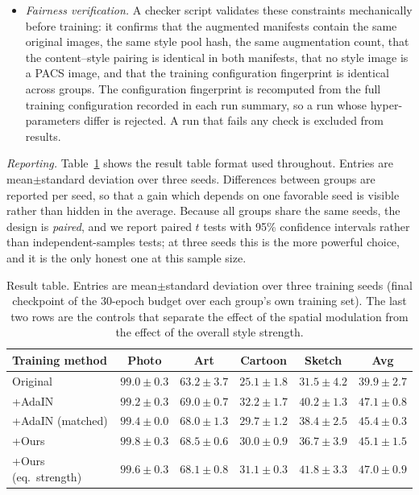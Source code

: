 \begin{itemize}
\item \textit{Fairness verification.} A checker script validates these constraints mechanically before training: it confirms that the augmented manifests contain the same original images, the same style pool hash, the same augmentation count, that the content--style pairing is identical in both manifests, that no style image is a PACS image, and that the training configuration fingerprint is identical across groups. The configuration fingerprint is recomputed from the full training configuration recorded in each run summary, so a run whose hyper-parameters differ is rejected. A run that fails any check is excluded from results.
\end{itemize}

\textit{Reporting.} Table~\ref{tab:results} shows the result table format used throughout. Entries are mean$\pm$standard deviation over three seeds. Differences between groups are reported per seed, so that a gain which depends on one favorable seed is visible rather than hidden in the average. Because all groups share the same seeds, the design is \emph{paired}, and we report paired $t$ tests with 95\% confidence intervals rather than independent-samples tests; at three seeds this is the more powerful choice, and it is the only honest one at this sample size.

\begin{table}[t]
\caption{Result table. Entries are mean$\pm$standard deviation over three training seeds (final checkpoint of the 30-epoch budget over each group's own training set). The last two rows are the controls that separate the effect of the spatial modulation from the effect of the overall style strength.}
\label{tab:results}
\centering
\scriptsize
\setlength{\tabcolsep}{2.0pt}
\begin{tabular}{@{}lccccc@{}}
\toprule
Training method & Photo & Art & Cartoon & Sketch & Avg \\
\midrule
Original & $99.0\pm0.3$ & $63.2\pm3.7$ & $25.1\pm1.8$ & $31.5\pm4.2$ & $39.9\pm2.7$ \\
+AdaIN   & $99.2\pm0.3$ & $69.0\pm0.7$ & $32.2\pm1.7$ & $40.2\pm1.3$ & $\mathbf{47.1\pm0.8}$ \\
+AdaIN (matched) & $99.4\pm0.0$ & $68.0\pm1.3$ & $29.7\pm1.2$ & $38.4\pm2.5$ & $45.4\pm0.3$ \\
+Ours    & $99.8\pm0.3$ & $68.5\pm0.6$ & $30.0\pm0.9$ & $36.7\pm3.9$ & $45.1\pm1.5$ \\
+Ours (eq.\ strength) & $99.6\pm0.3$ & $68.1\pm0.8$ & $31.1\pm0.3$ & $41.8\pm3.3$ & $\mathbf{47.0\pm0.9}$ \\
\bottomrule
\end{tabular}
\end{table}

